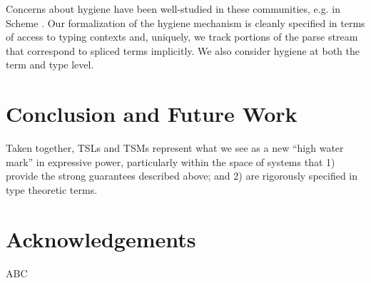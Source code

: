 \documentclass{sig-alternate}[10pt]
\begin{document}
Concerns about hygiene have been well-studied in these communities, e.g. in Scheme \cite{Dybvig:1992:SAS:173617.173620}. 
Our formalization of the hygiene mechanism is cleanly specified in terms of access to typing contexts and, uniquely, we track portions of the parse stream that correspond to spliced terms implicitly. We also consider hygiene at both the term and type level.

\section{Conclusion and Future Work}\label{conclusion}
Taken together, TSLs and TSMs represent what we see as a new ``high water mark'' in expressive power, particularly within the space of systems that 1) provide the strong  guarantees described above; and 2) are rigorously specified in type theoretic terms.

\section*{Acknowledgements}
ABC



\end{document}
